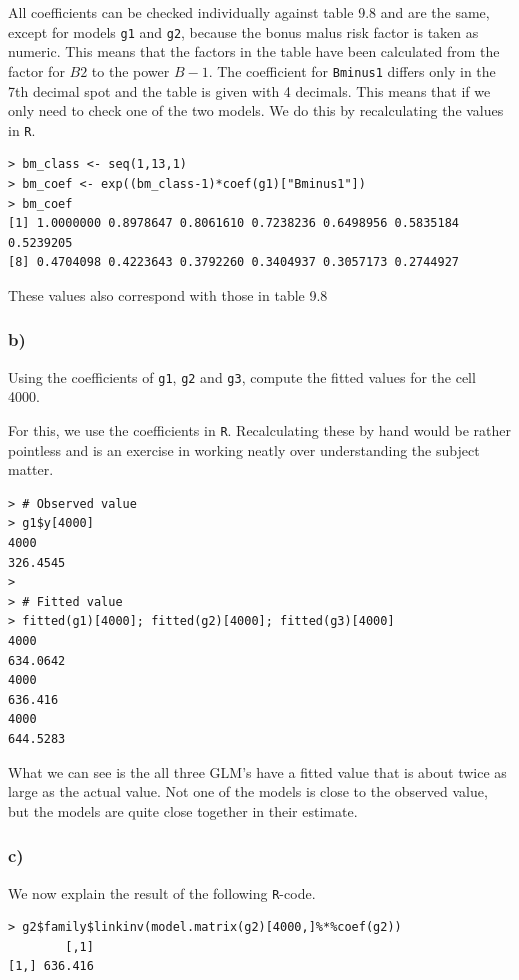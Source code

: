 \documentclass[11pt]{article}
\begin{document}
All coefficients can be checked individually against table 9.8 and are the same, except for models \verb|g1| and \verb|g2|, because the bonus malus risk factor is taken as numeric. This means that the factors in the table have been calculated from the factor for $B2$ to the power $B - 1$. The coefficient for \verb|Bminus1| differs only in the 7th decimal spot and the table is given with 4 decimals. This means that if we only need to check one of the two models. We do this by recalculating the values in \verb|R|.

\begin{verbatim}
> bm_class <- seq(1,13,1)
> bm_coef <- exp((bm_class-1)*coef(g1)["Bminus1"])
> bm_coef
[1] 1.0000000 0.8978647 0.8061610 0.7238236 0.6498956 0.5835184 0.5239205
[8] 0.4704098 0.4223643 0.3792260 0.3404937 0.3057173 0.2744927
\end{verbatim}

These values also correspond with those in table 9.8

\subsubsection*{b)}
Using the coefficients of \verb|g1|, \verb|g2| and \verb|g3|, compute the fitted values for the cell 4000.

For this, we use the coefficients in \verb|R|. Recalculating these by hand would be rather pointless and is an exercise in working neatly over understanding the subject matter.

\begin{verbatim}
> # Observed value
> g1$y[4000]
4000 
326.4545 
> 
> # Fitted value
> fitted(g1)[4000]; fitted(g2)[4000]; fitted(g3)[4000]
4000 
634.0642 
4000 
636.416 
4000 
644.5283 
\end{verbatim}

What we can see is the all three GLM's have a fitted value that is about twice as large as the actual value. Not one of the models is close to the observed value, but the models are quite close together in their estimate.

\subsubsection*{c)}

We now explain the result of the following \verb|R|-code.

\begin{verbatim}
> g2$family$linkinv(model.matrix(g2)[4000,]%*%coef(g2))
        [,1]
[1,] 636.416
\end{verbatim}
\end{document}
